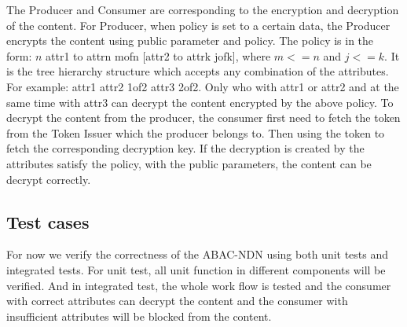 The Producer and Consumer are corresponding to the encryption and decryption of the content. For Producer, when policy is set to a certain data, the Producer encrypts the content using public parameter and policy. The policy is in the form: $n$ attr1 to attrn mofn [attr2 to attrk jofk], where $m<=n$ and $j<=k$. It is the tree hierarchy structure which accepts any combination of the attributes. For example: attr1 attr2 1of2 attr3 2of2. Only who with attr1 or attr2 and at the same time with attr3 can decrypt the content encrypted by the above policy. To decrypt the content from the producer, the consumer first need to fetch the token from the Token Issuer which the producer belongs to. Then using the token to fetch the corresponding decryption key. If the decryption is created by the attributes satisfy the policy, with the public parameters, the content can be decrypt correctly.

\subsection{Test cases}
For now we verify the correctness of the ABAC-NDN using both unit tests and integrated tests. For unit test, all unit function in different components will be verified. And in integrated test, the whole work flow is tested and the consumer with correct attributes can decrypt the content and the consumer with insufficient attributes will be blocked from the content.